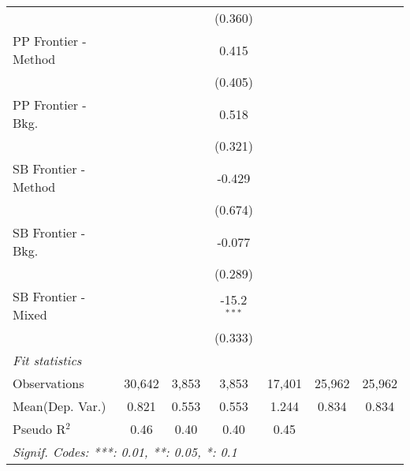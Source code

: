 \begin{tabular}{lcccccc}
                        &               &             & (0.360)       &               &        &   \\   
   PP Frontier - Method &               &             & 0.415         &               &        &   \\   
                        &               &             & (0.405)       &               &        &   \\   
   PP Frontier - Bkg.   &               &             & 0.518         &               &        &   \\   
                        &               &             & (0.321)       &               &        &   \\   
   SB Frontier - Method &               &             & -0.429        &               &        &   \\   
                        &               &             & (0.674)       &               &        &   \\   
   SB Frontier - Bkg.   &               &             & -0.077        &               &        &   \\   
                        &               &             & (0.289)       &               &        &   \\   
   SB Frontier - Mixed  &               &             & -15.2$^{***}$ &               &        &   \\   
                        &               &             & (0.333)       &               &        &   \\   
   \midrule
   \emph{Fit statistics}\\
   Observations         & 30,642        & 3,853       & 3,853         & 17,401        & 25,962 & 25,962\\  
Mean(Dep. Var.) & 0.821 & 0.553 & 0.553 & 1.244 & 0.834 & 0.834 \\
   Pseudo R$^2$         & 0.46          & 0.40        & 0.40          & 0.45          &        & \\  
   \midrule \midrule
   \multicolumn{7}{l}{\emph{Signif. Codes: ***: 0.01, **: 0.05, *: 0.1}}\\
\end{tabular}
\par\endgroup
